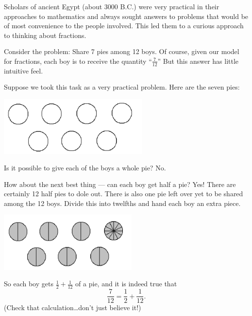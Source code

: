 Scholars of ancient Egypt (about 3000 B.C.) were very practical in their approaches to
mathematics and always sought answers to problems that would be of most
convenience to the people involved. This led them to a curious approach to thinking
about fractions.

\begin{example}
Consider the problem: Share 7 pies among 12 boys.
Of course, given our model for fractions, each boy is to receive the quantity ``$\frac 7 {12}$''
But  this answer has little intuitive feel.

Suppose we took this task as a very practical problem. Here are the seven pies:
\begin{center}
\includegraphics[height=3cm]{sevenpies}
\end{center}

Is it possible to give each of the boys a whole pie? No. 

How about the next best
thing --- can  each boy get half a pie? Yes! There are certainly 12 half pies to dole out. There
is also one pie left over yet to be shared among the 12 boys. Divide this into
twelfths and hand each boy an extra piece.

\begin{center}
\includegraphics[height=3cm]{sevenpies_split}
\end{center}

So each boy gets $\frac 1 2 + \frac 1{12}$ of a pie, and it is indeed true that
\[
\frac{7}{12} = \frac 1 2 + \frac 1 {12}.
\]
(Check that calculation\dots don't just believe it!)

\end{example}

